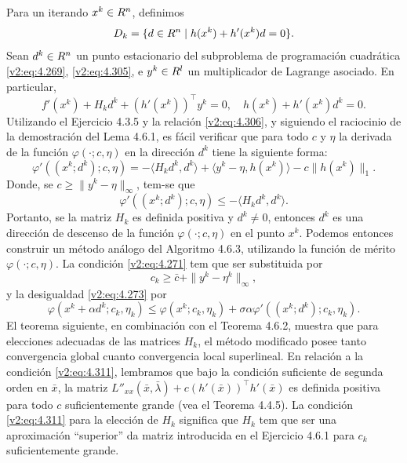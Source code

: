 Para un iterando $x^k \in R^n$, definimos
\begin{equation}
    D_k = \{d \in R^n \mid h(x^k) + h'(x^k)d = 0\}.
    \label{v2:eq:4.305}
\end{equation}
Sean $d^k \in R^n$ un punto estacionario del subproblema de programación cuadrática \eqref{v2:eq:4.269}, \eqref{v2:eq:4.305}, e $y^k \in R^l$ un multiplicador de Lagrange asociado. En particular,
\begin{equation}
    f'(x^k) + H_k d^k + (h'(x^k))^\top y^k = 0, \quad h(x^k) + h'(x^k)d^k = 0.
    \label{v2:eq:4.306}
\end{equation}
Utilizando el Ejercicio 4.3.5 y la relación \eqref{v2:eq:4.306}, y siguiendo el raciocinio de la demostración del Lema 4.6.1, es fácil verificar que para todo $c$ y $\eta$ la derivada de la función $\varphi(\cdot; c, \eta)$ en la dirección $d^k$ tiene la siguiente forma:
\begin{equation}
    \varphi'((x^k; d^k); c, \eta) = -\langle H_k d^k, d^k \rangle + \langle y^k - \eta, h(x^k) \rangle - c\|h(x^k)\|_1.
    \label{v2:eq:4.307}
\end{equation}
Donde, se $c \ge \|y^k - \eta\|_\infty$, tem-se que
\begin{equation}
    \varphi'((x^k; d^k); c, \eta) \le -\langle H_k d^k, d^k \rangle.
    \label{v2:eq:4.308}
\end{equation}
Portanto, se la matriz $H_k$ es definida positiva y $d^k \neq 0$, entonces $d^k$ es una dirección de descenso de la función $\varphi(\cdot; c, \eta)$ en el punto $x^k$.
Podemos entonces construir un método análogo del Algoritmo 4.6.3, utilizando la función de mérito $\varphi(\cdot; c, \eta)$. La condición \eqref{v2:eq:4.271} tem que ser substituida por
\begin{equation}
    c_k \ge \bar{c} + \|y^k - \eta^k\|_\infty,
    \label{v2:eq:4.309}
\end{equation}
y la desigualdad \eqref{v2:eq:4.273} por
\begin{equation}
    \varphi(x^k + \alpha d^k; c_k, \eta_k) \le \varphi(x^k; c_k, \eta_k) + \sigma\alpha\varphi'((x^k; d^k); c_k, \eta_k).
    \label{v2:eq:4.310}
\end{equation}
El teorema siguiente, en combinación con el Teorema 4.6.2, muestra que para elecciones adecuadas de las matrices $H_k$, el método modificado posee tanto convergencia global cuanto convergencia local superlineal. En relación a la condición \eqref{v2:eq:4.311}, lembramos que bajo la condición suficiente de segunda orden en $\bar{x}$, la matriz $L''_{xx}(\bar{x}, \bar{\lambda}) + c(h'(\bar{x}))^\top h'(\bar{x})$ es definida positiva para todo $c$ suficientemente grande (vea el Teorema 4.4.5). La condición \eqref{v2:eq:4.311} para la elección de $H_k$ significa que $H_k$ tem que ser una aproximación ``superior'' da matriz introducida en el Ejercicio 4.6.1 para $c_k$ suficientemente grande.

